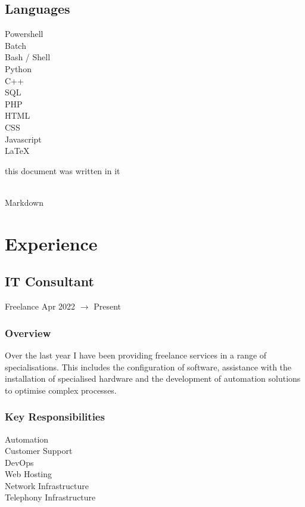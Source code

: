 \documentclass{report}
\begin{document}
		\subsection*{\faKeyboardO \nobreakspace Languages}
			\begin{multicols}{3}
				Powershell\\
				Batch\\
				Bash / Shell\\
				Python\\
				C++\\
				SQL\\
				PHP\\
				HTML\\
				CSS\\
				Javascript\\
				LaTeX \begin{tiny}this document was written in it\end{tiny}\\
				Markdown
			\end{multicols}
			
	\section*{\faBriefcase \nobreakspace Experience}
		\subsection*{\faUser \nobreakspace IT Consultant}
			Freelance \hfill Apr 2022 $\rightarrow$ Present
	
		\subsubsection*{Overview}
			Over the last year I have been providing freelance services in a range of specialisations.
			This includes the configuration of software, assistance with the installation of specialised
			hardware and the development of automation solutions to optimise complex processes.
		
		\subsubsection*{Key Responsibilities}
			\begin{multicols}{3}
				Automation\\
				Customer Support\\
				DevOps\\
				Web Hosting\\
				Network Infrastructure\\
				Telephony Infrastructure
			\end{multicols}
	
\end{document}
